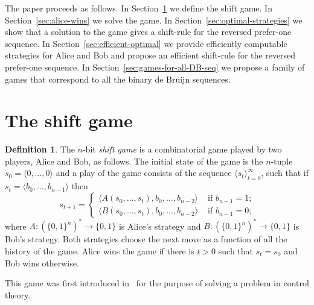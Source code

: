 \documentclass[final,12pt]{elsarticle}
\theoremstyle{definition} \newtheorem{definition}[theorem]{Definition} \newtheorem{observation}[theorem]{Observation} \newtheorem{example}[theorem]{Example} \newtheorem{remark}[theorem]{Remark} \newtheorem{corrolary}[theorem]{Corrolary}
\newcommand{\REF}[2]{#1~\ref{#2}}
\newcommand{\T}[1]{\langle{#1}\rangle} \DeclareMathOperator{\drop}{drop} \DeclareMathOperator{\dropbits}{drop\_bits} \DeclareMathOperator{\dropstates}{drop\_states} \DeclareMathOperator{\leadingForm}{LeadingForm} \DeclareMathOperator{\dv}{div} %
\begin{document}
The paper proceeds as follows. In \REF{Section}{sec:game} we define the shift game. In \REF{Section}{sec:alice-wins} we solve the game. In \REF{Section}{sec:optimal-strategies} we show that a solution to the game gives a shift-rule for the reversed prefer-one sequence. In Section~\ref{sec:efficient-optimal} we provide efficiently computable strategies for Alice and Bob and propose an efficient shift-rule for the reversed prefer-one sequence. In Section~\ref{sec:games-for-all-DB-seq} we propose a family of games that correspond to all the binary de Bruijn sequences.

\section{The shift game}
\label{sec:game}

\begin{definition}
	\label{Def:shift game} The $n$-bit
	\emph{shift game} is a combinatorial game played by two players, Alice and Bob, as follows. The initial state of the game is the $n$-tuple $s_0=\T{0,\dots,0}$ and a play of the game consists of the sequence $\T{s_t }_{t=0}^\infty$, such that if $s_t=\T{b_0, \dots, b_{n-1}}$ then 
		$$s_{t+1} =
		\begin{cases}
			\T{ A(s_0,\dots,s_t), b_0, \dots, b_{n-2}} &
			\text{ if $b_{n-1} = 1$;}      \\
			\T{ B(s_0,\dots,s_t), b_0, \dots, b_{n-2}} &
			\text{ if $b_{n-1} = 0$;}
		\end{cases}$$ where $A \colon(\{0,1\}^n)^* \to \{0,1\}$ is Alice's strategy and $B\colon (\{0,1\}^n)^* \to \{0,1\}$ is Bob's strategy. Both strategies choose the next move as a function of all the history of the game. Alice wins the game if there is $t>0$ such that $s_t=s_0$ and Bob wins otherwise.
\end{definition}

This game was first introduced in~\cite{weiss2007combinatorial} for the purpose of solving a problem in control theory. 
\end{document}
